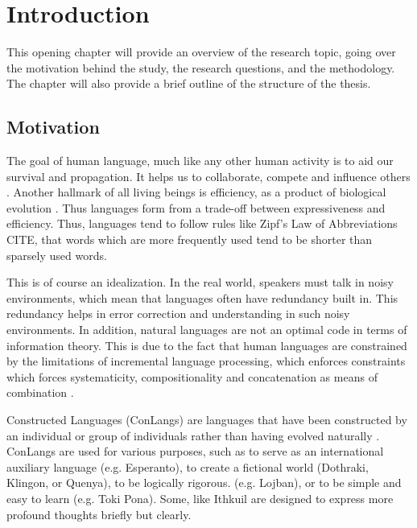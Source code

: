 
\chapter{Introduction}\label{chapter:introduction}

This opening chapter will provide an overview of the research topic, going over the motivation behind the study, the research questions, and the 
methodology. The chapter will also provide a brief outline of the structure of the thesis.

\section{Motivation}

The goal of human language, much like any other human activity is to aid our survival and propagation. It helps us to collaborate, compete and 
influence others \cite{Levshina_2022}. Another hallmark of all living beings is efficiency, as a product of biological evolution \cite{haCostBenefit2010}. 
Thus languages form from a trade-off between expressiveness and efficiency. Thus, languages tend to follow rules like Zipf's Law of Abbreviations CITE, 
that words which are more frequently used tend to be shorter than sparsely used words. 

This is of course an idealization. In the real world, speakers must talk in noisy environments, which mean that languages often have redundancy
built in. This redundancy helps in error correction and understanding in such noisy environments. In addition, natural languages are not an
optimal code in terms of information theory. This is due to the fact that human languages are constrained by the limitations of incremental
language processing, which enforces constraints which forces systematicity, compositionality and concatenation as means of combination \cite{futrellInformationTheoryBridge2022}.

Constructed Languages (ConLangs) are languages that have been constructed by an individual or group of individuals rather than having evolved 
naturally \cite{schreyerConstructedLanguages2021}. ConLangs are used for various purposes, such as to serve as an international auxiliary 
language (e.g. Esperanto), to create a fictional world (Dothraki, Klingon, or Quenya), to be logically rigorous. (e.g. Lojban), or to be simple 
and easy to learn (e.g. Toki Pona). Some, like Ithkuil \cite{Ithkuil2024} are designed to express more profound thoughts briefly but clearly. 


